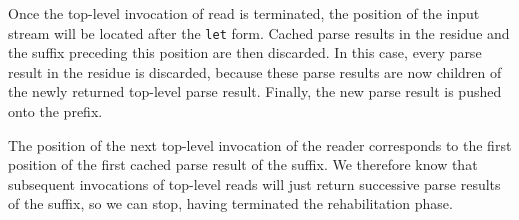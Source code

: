Once the top-level invocation of read is terminated, the position of
the input stream will be located after the \texttt{let} form.  Cached
parse results in the residue and the suffix preceding this position
are then discarded.  In this case, every parse result in the residue
is discarded, because these parse results are now children of the
newly returned top-level parse result.  Finally, the new parse result
is pushed onto the prefix.

The position of the next top-level invocation of the reader
corresponds to the first position of the first cached parse result of
the suffix.  We therefore know that subsequent invocations of
top-level reads will just return successive parse results of the
suffix, so we can stop, having terminated the rehabilitation phase.

